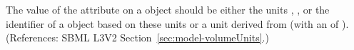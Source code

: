 The value of the attribute  on a \Model object should be
either the units , , or the identifier of a
\UnitDefinition object based on these units or a unit derived from
 (with an  of ).  (References: SBML L3V2
Section~\ref{sec:model-volumeUnits}.)

